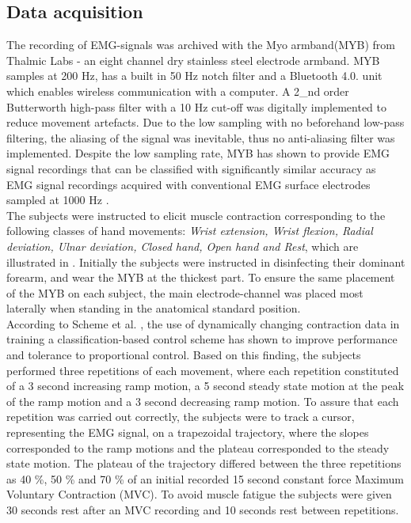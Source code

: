 \subsection{Data acquisition}
The recording of EMG-signals was archived with the Myo armband(MYB) from Thalmic Labs - an eight channel dry stainless steel electrode armband. MYB samples at 200 Hz, has a built in 50 Hz notch filter and a Bluetooth 4.0. unit which enables wireless communication with a computer. A 2_{nd} order Butterworth high-pass filter with a 10 Hz cut-off was digitally implemented to reduce movement artefacts. Due to the low sampling with no beforehand low-pass filtering, the aliasing of the signal was inevitable, thus no anti-aliasing filter was implemented. Despite the low sampling rate, MYB has shown to provide EMG signal recordings that can be classified with significantly similar accuracy as EMG signal recordings acquired with conventional EMG surface electrodes sampled at 1000 Hz \cite{Mendez2017}. \\
The subjects were instructed to elicit muscle contraction corresponding to the following classes of hand movements: \textit{Wrist extension, Wrist flexion, Radial deviation, Ulnar deviation, Closed hand, Open hand and Rest}, which are illustrated in . Initially the subjects were instructed in disinfecting their dominant forearm, and wear the MYB at the thickest part. To ensure the same placement of the MYB on each subject, the main electrode-channel was placed most laterally when standing in the anatomical standard position. \\
According to Scheme et al. \cite{Scheme2015}, the use of dynamically changing contraction data in training a classification-based control scheme has shown to improve performance and tolerance to proportional control. Based on this finding, the subjects performed three repetitions of each movement, where each repetition constituted of a 3 second increasing ramp motion, a 5 second steady state motion at the peak of the ramp motion and a 3 second decreasing ramp motion. To assure that each repetition was carried out correctly, the subjects were to track a cursor, representing the EMG signal, on a trapezoidal trajectory, where the slopes corresponded to the ramp motions and the plateau corresponded to the steady state motion. The plateau of the trajectory differed between the three repetitions as 40 \%, 50 \% and 70 \% of an initial recorded 15 second constant force Maximum Voluntary Contraction (MVC). To avoid muscle fatigue the subjects were given 30 seconds rest after an MVC recording and 10 seconds rest between repetitions. 